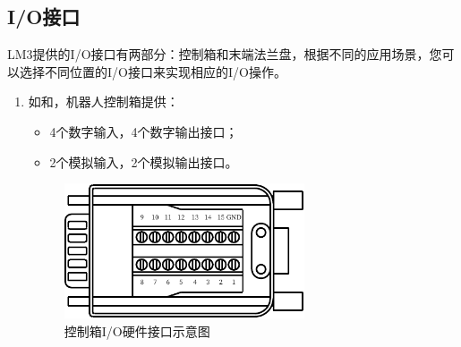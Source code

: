 \subsection{I/O接口}

LM3提供的I/O接口有两部分：控制箱和末端法兰盘，根据不同的应用场景，您可以选择不同位置的I/O接口来实现相应的I/O操作。

\begin{enumerate}
    \item 如和，机器人控制箱提供：
    \begin{itemize}
        \item 4个数字输入，4个数字输出接口；
        \item 2个模拟输入，2个模拟输出接口。
    \end{itemize}

\begin{figure}[ht]
    \centering
    \includegraphics[height=4cm]{line_graphs/robot_box_io_plugin.pdf}
    \caption{控制箱I/O硬件接口示意图}
    \label{fig:控制箱IO}
\end{figure}


\end{enumerate}
